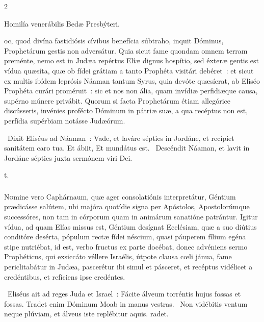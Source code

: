 \documentclass[9pt,twoside]{extarticle}
\begin{document}
\begin{multicols}{2}
\begin{center}Homilía venerábilis Bedæ Presbýteri.\\
\end{center}
oc, quod divína fastidiósis cívibus benefícia súbtraho, inquit Dóminus, Prophetárum gestis non adversátur. Quia sicut fame quondam omnem terram preménte, nemo est in Judæa repértus Elíæ dignus hospítio, sed éxteræ gentis est vídua quæsíta, quæ ob fídei grátiam a tanto Prophéta visitári debéret~: et sicut ex multis ibídem leprósis Náaman tantum Syrus, quia devóte quæsíerat, ab Eliséo Prophéta curári proméruit~: sic et nos non ália, quam invídiæ perfidiæque causa, supérno múnere privábit. Quorum si facta Prophetárum étiam allegórice discússeris, invénies profécto Dóminum in pátriæ suæ, a qua recéptus non est, perfídia supérbiam notásse Judæórum.

\begin{tightlist}{}
\item {}~Dixit Eliséus ad Náaman~: Vade, et laváre sépties in Jordáne, et recípiet sanitátem caro tua. Et ábiit, \textred{*} Et mundátus est. ~Descéndit Náaman, et lavit in Jordáne sépties juxta sermónem viri Dei. \item {}t.
\end{tightlist}

\subsubsection*{\center {}}
\lettrine{N}omine vero Caphárnaum, quæ ager consolatiónis interpretátur, Géntium prædicásse salútem, ubi majóra quotídie signa per Apóstolos, Apostolorúmque successóres, non tam in córporum quam in animárum sanatióne patrántur. Igitur vídua, ad quam Elías missus est, Géntium desígnat Ecclésiam, quæ a suo diútius conditóre desérta, pópulum rectæ fídei néscium, quasi páuperem fílium egéna stipe nutriébat, id est, verbo fructus ex parte docébat, donec advéniens sermo Prophéticus, qui exsiccáto véllere Israélis, útpote clausa cœli jánua, fame periclitabátur in Judæa, pascerétur ibi simul et pásceret, et recéptus vidélicet a credéntibus, et refíciens ipse credéntes.

\begin{tightlist}{}
\item {}~Eliséus ait ad reges Juda et Israel~: Fácite álveum torréntis hujus fossas et fossas. \textred{*} Tradet enim Dóminum Moab in manus vestras. ~Non vidébitis ventum neque plúviam, et álveus iste replébitur aquis. radet.
\item {}
\end{tightlist}


\end{multicols}
\end{document}
